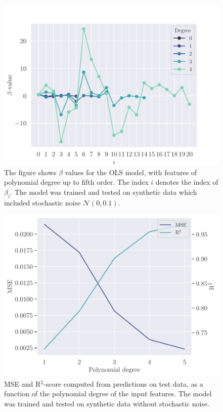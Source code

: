 \begin{figure}
    \centering
    \includegraphics[width=0.9\linewidth]{project-1/latex/figures/ols_beta_scaled_N50.pdf}
    \caption{The figure shows $\beta$ values for the OLS model, with features of polynomial degree up to fifth order. The index $i$ denotes the index of $\beta_{i}$. The model was trained and tested on synthetic data which included stochastic noise $\mathcal{N}(0, 0.1)$.}
    \label{fig:ols_beta_smooth}
\end{figure}
\begin{figure}
    \centering
    \includegraphics[width=0.9\linewidth]{project-1/latex/figures/ols_error_smooth_scaled_N50.pdf}
    \caption{MSE and R$^{2}$-score computed from predictions on test data, as a function of the polynomial degree of the input features. The model was trained and tested on synthetic data without stochastic noise.}
    \label{fig:ols_error_smooth}
\end{figure}
